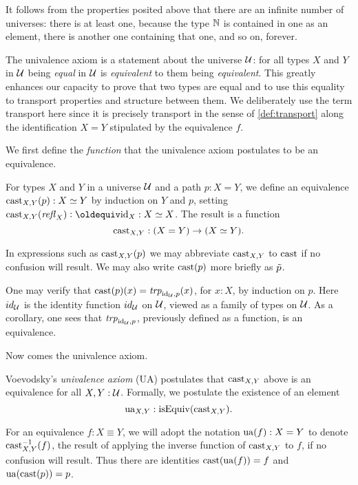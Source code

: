 It follows from the properties posited above that there are an infinite number of universes: there is at least one, because the type $\mathbb{N}$ is
contained in one as an element, there is another one containing that one, and so on, forever.

The univalence axiom is a statement about the universe $\mathcal{U}$: 
for all types $X$ and $Y$ in $\mathcal{U}$ being \emph{equal} in $\mathcal{U}$ is 
\emph{equivalent} to them being \emph{equivalent}. This greatly
enhances our capacity to prove that two types are equal
and to use this equality to transport properties and structure
between them. We deliberately use the term transport
here since it is precisely transport in the sense of
\cref{def:transport} along the identification
$X = Y$ stipulated by the equivalence $f$.

We first define the \emph{function} that
the univalence axiom postulates to be an equivalence.

\begin{definition}\label{def:idtoeq}
  For types $X$ and $Y$ in a universe $\mathcal{U}$ and a path $p : X = Y$, we define an equivalence $\mathrm{cast}_{X,Y} (p) : X\simeq Y$ by induction on $Y$ and $p$, setting
  $\cast_{X,Y} (\refl X) \defeq \id_X : X \equiv X$.  The result is a function \[ \mathrm{cast}_{X,Y} : (X = Y) \to (X\simeq Y). \]
\end{definition}
  
In expressions such as $\mathrm{cast}_{X,Y}(p)$ we may abbreviate $\mathrm{cast}_{X,Y}$ to $\mathrm{cast}$ if no confusion will result.
We may also write $\mathrm{cast} (p)$ more briefly as $\tilde {p}$.

One may verify that $\mathrm{cast}(p)(x) = \mathop{\mathit{trp}_{\mathord{\mathrm{id}}_{\mathcal{U}}, p}} (x)$, for $x : X$, by induction on $p$.
Here $id_{\mathcal{U}}$ is the identity function $id_{\mathcal{U}}$ on $\mathcal{U}$, viewed as a family of types on $\mathcal{U}$. 
As a corollary, one sees that $\mathop{\mathit{trp}_{\mathord{\mathrm{id}}_{\mathcal{U}}, p}}$, previously defined as a function, is an equivalence.

Now comes the univalence axiom.

\begin{definition}\label{def:univalence}
Voevodsky's \emph{univalence axiom} (UA) postulates that 
$\mathrm{cast}_{X,Y}$ above is an equivalence for all $X,Y:\mathcal{U}$.
Formally, we postulate the existence of an element \[ \mathrm{ua}_{X,Y} : \mathrm{isEquiv}(\mathrm{cast}_{X,Y}).\]
\end{definition}

For an equivalence $f: X\equiv Y$, we will adopt the notation $\mathrm{ua}(f) : X = Y $ to denote $\mathrm{cast}_{X,Y}^{-1}(f)$, the result of applying the
inverse function of $\mathrm{cast}_{X,Y}$ to $f$, if no confusion will result.  Thus there are identities $\mathrm{cast} (\mathrm{ua} (f)) = f$ and $\mathrm{ua} (\mathrm{cast} (p)) = p$.

